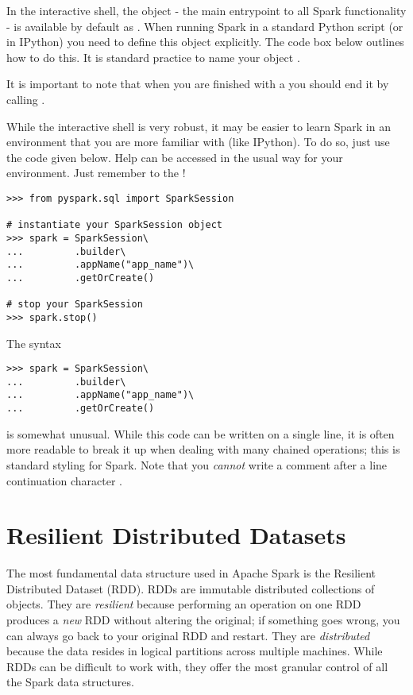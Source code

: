 In the interactive shell, the  object - the main entrypoint to all Spark functionality - is available by default as . 
When running Spark in a standard Python script (or in IPython) you need to define this object explicitly. The code box below outlines how to do this. 
It is standard practice to name your  object .

It is important to note that when you are finished with a  you should end it by calling .

\begin{info}
While the interactive shell is very robust, it may be easier to learn Spark in an environment that you are more familiar with (like IPython). 
To do so, just use the code given below. Help can be accessed in the usual way for your environment. 
Just remember to  the !
\end{info}

\begin{lstlisting}
>>> from pyspark.sql import SparkSession

# instantiate your SparkSession object
>>> spark = SparkSession\
...			.builder\
...			.appName("app_name")\
...			.getOrCreate()

# stop your SparkSession
>>> spark.stop()
\end{lstlisting}

\begin{info}
The syntax
\begin{lstlisting}
>>> spark = SparkSession\
...			.builder\
...			.appName("app_name")\
...			.getOrCreate()
\end{lstlisting}
is somewhat unusual. 
While this code can be written on a single line, it is often more readable to break it up when dealing with many chained operations; this is standard styling for Spark. 
Note that you \textit{cannot} write a comment after a line continuation character .
\end{info}


\section*{Resilient Distributed Datasets} %
The most fundamental data structure used in Apache Spark is the Resilient Distributed Dataset (RDD).
RDDs are immutable distributed collections of objects.
They are \textit{resilient} because performing an operation on one RDD produces a \textit{new} RDD without altering the original; if something goes wrong, you can always go back to your original RDD and restart.
They are \textit{distributed} because the data resides in logical partitions across multiple machines.
While RDDs can be difficult to work with, they offer the most granular control of all the Spark data structures.

